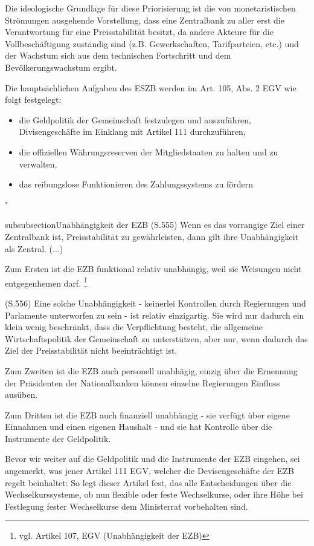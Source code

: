 \documentclass[
        onecolumn,
        a4paper,
        abstracton,
        parskip=half
        ,final
        ]{scrartcl}
\begin{document}
Die ideologische Grundlage f{\"u}r diese Priorisierung ist die von monetaristischen Str{\"o}mungen ausgehende Vorstellung, dass eine Zentralbank zu aller erst die Verantwortung f{\"u}r eine Preisstabilit{\"a}t besitzt, da andere Akteure f{\"u}r die Vollbesch{\"a}ftigung zust{\"a}ndig sind (z.B. Gewerkschaften, Tarifparteien, etc.) und der Wachstum sich aus dem technischen Fortschritt und dem Bev{\"o}lkerungswachstum ergibt.

Die haupts{\"a}chlichen Aufgaben des ESZB werden im Art. 105, Abs. 2 EGV wie folgt festgelegt:
\begin{itemize}
    \item{die Geldpolitik der Gemeinschaft festzulegen und auszuf{\"u}hren, Divisengesch{\"a}fte im Einklang mit Artikel 111 durchzuf{\"u}hren,}
    \item{die offiziellen W{\"a}hrungsreserven der Mitgliedstaaten zu halten und zu verwalten,}
    \item{das reibungslose Funktionieren des Zahlungssystems zu f{\"o}rdern}
\end{itemize} \citep[vgl.][S.555]{Basseler2010} "

subsubsection{Unabh{\"a}ngigkeit der EZB}
(S.555)
Wenn es das vorrangige Ziel einer Zentralbank ist, Preisstabilit{\"a}t zu gew{\"a}hrleisten, dann gilt ihre Unabh{\"a}ngigkeit als Zentral. (...)

Zum Ersten ist die EZB funktional relativ unabh{\"a}ngig, weil sie Weisungen nicht entgegenhemen darf. \footnote[34]{vgl. Artikel 107, EGV (Unabh{\"a}ngigkeit der EZB)}

(S.556)
Eine solche Unabh{\"a}ngigkeit - keinerlei Kontrollen durch Regierungen und Parlamente unterworfen zu sein -  ist relativ einzigartig. Sie wird nur dadurch ein klein wenig beschr{\"a}nkt, dass die Verpflichtung besteht, die allgemeine Wirtschaftspolitik der Gemeinschaft zu unterst{\"u}tzen, aber nur, wenn dadurch das Ziel der Preisstabilit{\"a}t nicht beeintr{\"a}chtigt ist.

Zum Zweiten ist die EZB auch personell unabh{\"a}gig, einzig {\"u}ber die Ernennung der Pr{\"a}sidenten der Nationalbanken k{\"o}nnen einzelne Regierungen Einfluss aus{\"u}ben.

Zum Dritten ist die EZB auch finanziell unabh{\"a}ngig - sie verf{\"u}gt {\"u}ber eigene Einnahmen und einen eigenen Haushalt - und sie hat Kontrolle {\"u}ber die Instrumente der Geldpolitik.


Bevor wir weiter auf die Geldpolitik und die Instrumente der EZB eingehen, sei angemerkt, was jener Artikel 111 EGV, welcher die Devisengesch{\"a}fte der EZB regelt beinhaltet:
So legt dieser Artikel fest, das alle Entscheidungen {\"u}ber die Wechselkurssysteme, ob nun flexible oder feste Wechselkurse, oder ihre H{\"o}he bei Festlegung fester Wechselkurse dem Ministerrat vorbehalten sind. \citep[vgl.][S.555]{Basseler2010}
\end{document}
